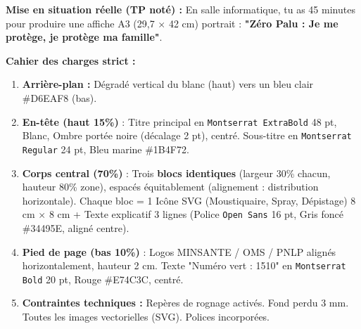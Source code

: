 \documentclass[11pt]{article}
\begin{document}
\begin{exercice}
\textbf{Mise en situation réelle (TP noté) :} En salle informatique, tu as 45 minutes pour produire une affiche A3 (29,7 $\times$ 42 cm) portrait : \textbf{"Zéro Palu : Je me protège, je protège ma famille"}.

\textbf{Cahier des charges strict :}
\begin{enumerate}
    \item \textbf{Arrière-plan :} Dégradé vertical du blanc (haut) vers un bleu clair \#D6EAF8 (bas).
    \item \textbf{En-tête (haut 15\%)} : Titre principal en \texttt{Montserrat ExtraBold} 48 pt, Blanc, Ombre portée noire (décalage 2 pt), centré. Sous-titre en \texttt{Montserrat Regular} 24 pt, Bleu marine \#1B4F72.
    \item \textbf{Corps central (70\%)} : Trois \textbf{blocs identiques} (largeur 30\% chacun, hauteur 80\% zone), espacés équitablement (alignement : distribution horizontale). Chaque bloc = 1 Icône SVG (Moustiquaire, Spray, Dépistage) 8 cm $\times$ 8 cm + Texte explicatif 3 lignes (Police \texttt{Open Sans} 16 pt, Gris foncé \#34495E, aligné centre).
    \item \textbf{Pied de page (bas 10\%)} : Logos MINSANTE / OMS / PNLP alignés horizontalement, hauteur 2 cm. Texte "Numéro vert : 1510" en \texttt{Montserrat Bold} 20 pt, Rouge \#E74C3C, centré.
    \item \textbf{Contraintes techniques :} Repères de rognage activés. Fond perdu 3 mm. Toutes les images vectorielles (SVG). Polices incorporées.
\end{enumerate}


\end{exercice}
\end{document}
